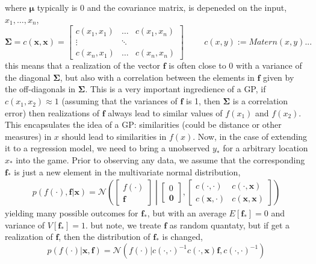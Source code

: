 where $\bm{\mu}$ typically is $0$ and the covariance matrix, is depeneded on the input, $x_1, \dots, x_n$, 
 $$\bm{\Sigma} = c(\textbf{x}, \textbf{x}) = \begin{bmatrix}
    c(x_1,x_1) & \dots & c(x_1,x_n)\\
    \vdots& \ddots\\
    c(x_n,x_1) & \dots & c(x_n,x_n)
\end{bmatrix}\hspace{1cm} c(x, y) := Matern(x,y)...$$ 
this means that a realization of the vector $\textbf{f}$ is often close to 0 with a variance of the diagonal $\bm{\Sigma}$,
but also with a correlation between the elements in $\textbf{f}$ given by the off-diagonals in $\bm{\Sigma}$. This is a very important
ingredience of a GP, if $c(x_1,x_2) \approx 1$ (assuming that the variances of $\textbf{f}$ is 1, then $\bm{\Sigma}$ is a correlation error)
then realizations of $\textbf{f}$ always lead to similar values of $f(x_1)$ and $f(x_2)$. This encapsulates the idea of a GP: 
similarities (could be distance or other measures) in $x$ should lead to similarities in $f(x)$. Now, in the case of extending it to 
a regression model, we need to bring a unobserved $y_*$ for a arbitrary location $x_*$ into the game. Prior to observing any data, 
we assume that the corresponding $\textbf{f}_*$ is just a new element in the multivariate normal distribution, 
\begin{align}
    p(f(\cdot),\textbf{f}|\textbf{x}) = \mathcal{N}\left(\begin{bmatrix}
        f(\cdot)\\ \textbf{f}
    \end{bmatrix} \middle| \begin{bmatrix}
        0\\ \textbf{0}
    \end{bmatrix}, \begin{bmatrix}
        c(\cdot, \cdot) & c(\cdot,\textbf{x})\\
        c(\textbf{x}, \cdot) & c(\textbf{x}, \textbf{x})
    \end{bmatrix} \right)
\end{align}
yielding many possible outcomes for $\textbf{f}_*$, but with an average $E[\textbf{f}_*] = 0$ and variance of $V[\textbf{f}_*] = 1$.
but note, we treate $\textbf{f}$ as random quantaty, but if get a realization of $\textbf{f}$, then
the distribution of $\textbf{f}_*$ is changed, 
$$p(f(\cdot)|\textbf{x}, \textbf{f}) = \mathcal{N}(f(\cdot)|c(\cdot, \cdot)^{-1}c(\cdot, \textbf{x})\textbf{f}, c(\cdot, \cdot)^{-1})$$

